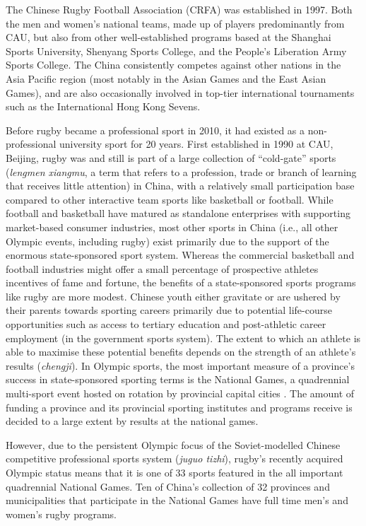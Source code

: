   The Chinese Rugby Football Association (CRFA) was established in 1997. Both the men and women’s national teams, made up of players predominantly from CAU, but also from other well-established programs based at the Shanghai Sports University, Shenyang Sports College, and the People’s Liberation Army Sports College.  The China consistently competes against other nations in the Asia Pacific region (most notably in the Asian Games and the East Asian Games), and are also occasionally involved in top-tier international tournaments such as the International Hong Kong Sevens.

  Before rugby became a professional sport in 2010, it had existed as a non-professional university sport for 20 years.  First established in 1990 at CAU, Beijing, rugby was and still is part of a large collection of ``cold-gate'' sports (\textit{lengmen xiangmu}, a term that refers to a profession, trade or branch of learning that receives little attention) in China, with a relatively small participation base compared to other interactive team sports like basketball or football.  While football and basketball have matured as standalone enterprises with supporting market-based consumer industries, most other sports in China (i.e., all other Olympic events, including rugby) exist primarily due to the support of the enormous state-sponsored sport system.  Whereas the commercial basketball and football industries might offer a small percentage of prospective athletes incentives of fame and fortune, the benefits of a state-sponsored sports programs like rugby are more modest.  Chinese youth either gravitate or are ushered by their parents towards sporting careers primarily due to potential life-course opportunities such as access to tertiary education and post-athletic career employment (in the government sports system).  The extent to which an athlete is able to maximise these potential benefits depends on the strength of an athlete's results (\textit{chengji}).
  In Olympic sports, the most important measure of a province's success in state-sponsored sporting terms is the National Games, a quadrennial multi-sport event hosted on rotation by provincial capital cities \citep{Hong2002}.  The amount of funding a province and its provincial sporting institutes and programs receive is decided to a large extent by results at the national games.

  However, due to the persistent Olympic focus of the Soviet-modelled Chinese competitive professional sports system (\textit{juguo tizhi}), rugby's recently acquired Olympic status means that it is one of 33 sports featured in the all important quadrennial National Games.  Ten of China's collection of 32 provinces and municipalities that participate in the National Games have full time men's and women's rugby programs.

